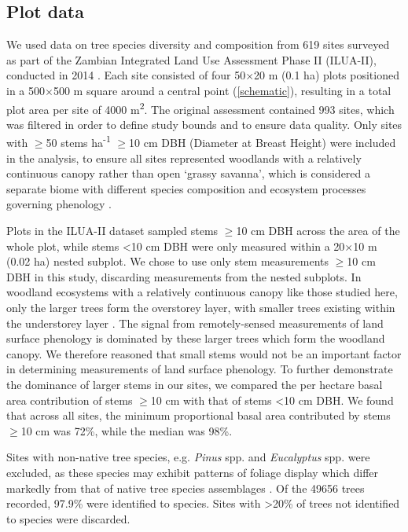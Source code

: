 \documentclass[11pt,a4paper]{article}
\begin{document}
\subsection{Plot data}

We used data on tree species diversity and composition from 619 sites surveyed
as part of the Zambian Integrated Land Use Assessment Phase II (ILUA-II),
conducted in 2014 \citep{Mukosha2009, Pelletier2018}. Each site consisted of
four 50$\times$20 m (0.1 ha) plots positioned in a 500$\times$500 m square
around a central point (\autoref{schematic}), resulting in a total plot area
per site of \num{4000} m\textsuperscript{2}. The original assessment contained
993 sites, which was filtered in order to define study bounds and to ensure
data quality. Only sites with $\geq$50 stems ha\textsuperscript{-1} $\geq$10 cm
DBH (Diameter at Breast Height) were included in the analysis, to ensure all
sites represented woodlands with a relatively continuous canopy rather than
open `grassy savanna', which is considered a separate biome with different
species composition and ecosystem processes governing phenology
\citep{Morellato2013, Keith2020}. 

Plots in the ILUA-II dataset sampled stems $\geq$10 cm DBH across the area of
the whole plot, while stems <10 cm DBH were only measured within a 20$\times$10
m (0.02 ha) nested subplot. We chose to use only stem measurements $\geq$10 cm
DBH in this study, discarding measurements from the nested subplots. In
woodland ecosystems with a relatively continuous canopy like those studied
here, only the larger trees form the overstorey layer, with smaller trees
existing within the understorey layer \citep{Chidumayo2001}. The signal from
remotely-sensed measurements of land surface phenology is dominated by these
larger trees which form the woodland canopy. We therefore reasoned that small
stems would not be an important factor in determining measurements of land
surface phenology. To further demonstrate the dominance of larger stems in our
sites, we compared the per hectare basal area contribution of stems $\geq$10 cm
with that of stems <10 cm DBH. We found that across all sites, the minimum
proportional basal area contributed by stems $\geq$10 cm was 72\%, while the
median was 98\%.

Sites with non-native tree species, e.g. \textit{Pinus} spp. and
\textit{Eucalyptus} spp. were excluded, as these species may exhibit patterns
of foliage display which differ markedly from that of native tree species
assemblages \citep{Broadhead2003}. Of the \num{49656} trees recorded, 97.9\%
were identified to species. Sites with >20\% of trees not identified to species
were discarded.
\end{document}
